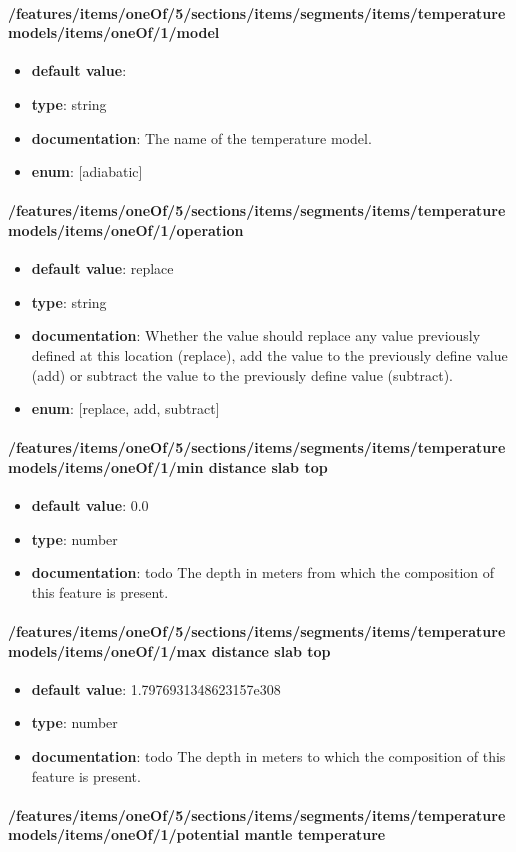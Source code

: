 \paragraph{/features/items/oneOf/5/sections/items/segments/items/temperature models/items/oneOf/1/model}
\begin{itemize}\item {\bf default value}: 
\item {\bf type}: string
\item {\bf documentation}: The name of the temperature model.
\item {\bf enum}: [adiabatic]\end{itemize}\paragraph{/features/items/oneOf/5/sections/items/segments/items/temperature models/items/oneOf/1/operation}
\begin{itemize}\item {\bf default value}: replace
\item {\bf type}: string
\item {\bf documentation}: Whether the value should replace any value previously defined at this location (replace), add the value to the previously define value (add) or subtract the value to the previously define value (subtract).
\item {\bf enum}: [replace, add, subtract]\end{itemize}\paragraph{/features/items/oneOf/5/sections/items/segments/items/temperature models/items/oneOf/1/min distance slab top}
\begin{itemize}\item {\bf default value}: 0.0
\item {\bf type}: number
\item {\bf documentation}: todo The depth in meters from which the composition of this feature is present.
\end{itemize}\paragraph{/features/items/oneOf/5/sections/items/segments/items/temperature models/items/oneOf/1/max distance slab top}
\begin{itemize}\item {\bf default value}: 1.7976931348623157e308
\item {\bf type}: number
\item {\bf documentation}: todo The depth in meters to which the composition of this feature is present.
\end{itemize}\paragraph{/features/items/oneOf/5/sections/items/segments/items/temperature models/items/oneOf/1/potential mantle temperature}

